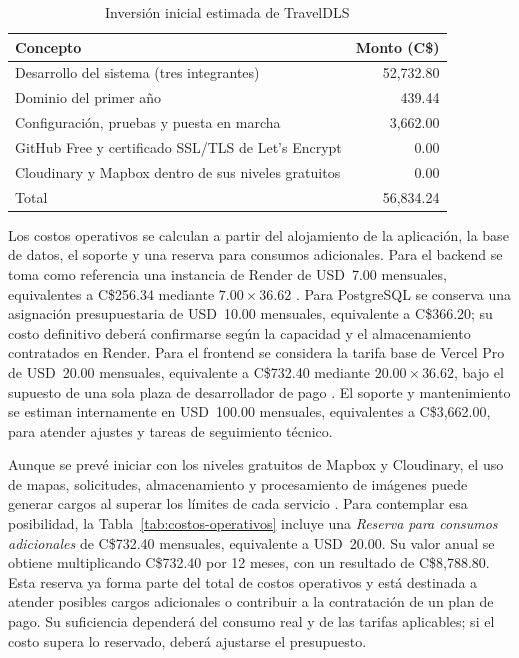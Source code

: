 \begin{table}[H]
\centering
\caption{Inversión inicial estimada de TravelDLS}
\label{tab:inversion-inicial}
\begin{tabularx}{\textwidth}{>{\RaggedRight\arraybackslash}X r}
\toprule
Concepto & Monto (C\$) \\
\midrule
Desarrollo del sistema (tres integrantes) & 52,732.80 \\
Dominio del primer año & 439.44 \\
Configuración, pruebas y puesta en marcha & 3,662.00 \\
GitHub Free y certificado SSL/TLS de Let's Encrypt & 0.00 \\
Cloudinary y Mapbox dentro de sus niveles gratuitos & 0.00 \\
\midrule
Total & 56,834.24 \\
\bottomrule
\end{tabularx}
\end{table}

Los costos operativos se calculan a partir del alojamiento de la aplicación, la base de datos, el soporte y una reserva para consumos adicionales. Para el backend se toma como referencia una instancia de Render de USD~7.00 mensuales, equivalentes a C\$256.34 mediante $7.00 \times 36.62$ \parencite{renderpricing}. Para PostgreSQL se conserva una asignación presupuestaria de USD~10.00 mensuales, equivalente a C\$366.20; su costo definitivo deberá confirmarse según la capacidad y el almacenamiento contratados en Render. Para el frontend se considera la tarifa base de Vercel Pro de USD~20.00 mensuales, equivalente a C\$732.40 mediante $20.00 \times 36.62$, bajo el supuesto de una sola plaza de desarrollador de pago \parencite{vercelpricing}. El soporte y mantenimiento se estiman internamente en USD~100.00 mensuales, equivalentes a C\$3,662.00, para atender ajustes y tareas de seguimiento técnico.

Aunque se prevé iniciar con los niveles gratuitos de Mapbox y Cloudinary, el uso de mapas, solicitudes, almacenamiento y procesamiento de imágenes puede generar cargos al superar los límites de cada servicio \parencite{mapboxpricing,cloudinarypricing}. Para contemplar esa posibilidad, la Tabla~\ref{tab:costos-operativos} incluye una \textit{Reserva para consumos adicionales} de C\$732.40 mensuales, equivalente a USD~20.00. Su valor anual se obtiene multiplicando C\$732.40 por 12 meses, con un resultado de C\$8,788.80. Esta reserva ya forma parte del total de costos operativos y está destinada a atender posibles cargos adicionales o contribuir a la contratación de un plan de pago. Su suficiencia dependerá del consumo real y de las tarifas aplicables; si el costo supera lo reservado, deberá ajustarse el presupuesto.

